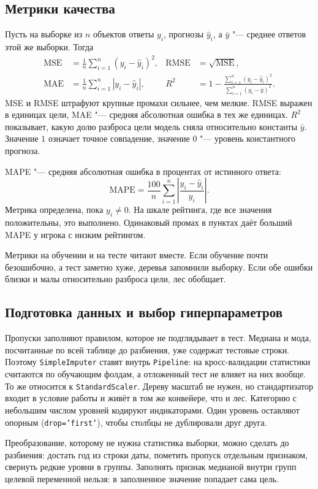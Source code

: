 \documentclass[14pt]{extarticle}
\begin{document}
\subsection{Метрики качества}
Пусть на выборке из $n$ объектов ответы $y_i$, прогнозы $\hat y_i$, а $\bar y$ "--- среднее ответов этой же выборки. Тогда
\begin{align*}
\mathrm{MSE} &= \frac{1}{n}\sum_{i=1}^{n}(y_i - \hat y_i)^2, &
\mathrm{RMSE} &= \sqrt{\mathrm{MSE}}, \\[1mm]
\mathrm{MAE} &= \frac{1}{n}\sum_{i=1}^{n}|y_i - \hat y_i|, &
R^2 &= 1 - \frac{\sum_{i=1}^{n}(y_i - \hat y_i)^2}{\sum_{i=1}^{n}(y_i - \bar y)^2}.
\end{align*}
MSE и RMSE штрафуют крупные промахи сильнее, чем мелкие. RMSE выражен в единицах цели, MAE "--- средняя абсолютная ошибка в тех же единицах. $R^2$ показывает, какую долю разброса цели модель сняла относительно константы $\bar y$. Значение $1$ означает точное совпадение, значение $0$ "--- уровень константного прогноза.

MAPE "--- средняя абсолютная ошибка в процентах от истинного ответа:
\[
\mathrm{MAPE} = \frac{100}{n}\sum_{i=1}^{n}\left|\frac{y_i - \hat y_i}{y_i}\right|.
\]
Метрика определена, пока $y_i \neq 0$. На шкале рейтинга, где все значения положительны, это выполнено. Одинаковый промах в пунктах даёт больший MAPE у игрока с низким рейтингом.

Метрики на обучении и на тесте читают вместе. Если обучение почти безошибочно, а тест заметно хуже, деревья запомнили выборку. Если обе ошибки близки и малы относительно разброса цели, лес обобщает.

\subsection{Подготовка данных и выбор гиперпараметров}
Пропуски заполняют правилом, которое не подглядывает в тест. Медиана и мода, посчитанные по всей таблице до разбиения, уже содержат тестовые строки. Поэтому \texttt{SimpleImputer} ставят внутрь \texttt{Pipeline}: на кросс-валидации статистики считаются по обучающим фолдам, а отложенный тест не влияет на них вообще. То же относится к \texttt{StandardScaler}. Дереву масштаб не нужен, но стандартизатор входит в условие работы и живёт в том же конвейере, что и лес. Категорию с небольшим числом уровней кодируют индикаторами. Один уровень оставляют опорным (\texttt{drop='first'}), чтобы столбцы не дублировали друг друга.

Преобразование, которому не нужна статистика выборки, можно сделать до разбиения: достать год из строки даты, пометить пропуск отдельным признаком, свернуть редкие уровни в группы. Заполнять признак медианой внутри групп целевой переменной нельзя: в заполненное значение попадает сама цель.
\end{document}
